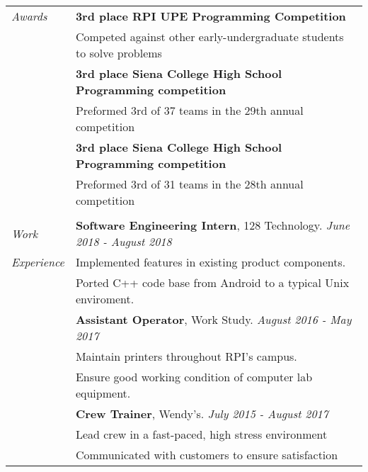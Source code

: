 \documentclass[letterpaper,10pt,oneside]{article}
\newcommand\entrytitle[1]{{\addfontfeature{LetterSpace=2}\textbf{#1}}}
\begin{document}
\begin{tabular}{@{} l l}

  \textit{Awards}
  & \entrytitle{3rd place RPI UPE Programming Competition} \\
  & Competed against other early-undergraduate students to solve problems \\
  & \entrytitle{3rd place Siena College High School Programming competition} \\
  & Preformed 3rd of 37 teams in the 29th annual competition \\
  & \entrytitle{3rd place Siena College High School Programming competition} \\
  & Preformed 3rd of 31 teams in the 28th annual competition \\
  & \\

  \textit{Work}
  & \entrytitle{Software Engineering Intern}, 128 Technology. \textit{June 2018 - August 2018} \\
  \textit{Experience}
  & Implemented features in existing product components. \\
  & Ported C++ code base from Android to a typical Unix enviroment. \\
  & \entrytitle{Assistant Operator}, Work Study. \textit{August 2016 - May 2017} \\
  & Maintain printers throughout RPI's campus. \\
  & Ensure good working condition of computer lab equipment. \\
  & \entrytitle{Crew Trainer}, Wendy's. \textit{July 2015 - August 2017} \\
  & Lead crew in a fast-paced, high stress environment \\
  & Communicated with customers to ensure satisfaction \\

\end{tabular}
\end{document}
